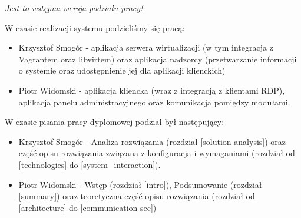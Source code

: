 \documentclass[../wstep.tex]{subfiles}
\begin{document}
\textit{Jest to wstępna wersja podziału pracy!}

W czasie realizacji systemu podzieliśmy się pracą:
\begin{itemize}
	\item Krzysztof Smogór - aplikacja serwera wirtualizacji (w tym integracja z Vagrantem oraz libvirtem) oraz aplikacja nadzorcy (przetwarzanie informacji o systemie oraz udostępnienie jej dla aplikacji klienckich)
	\item Piotr Widomski - aplikacja kliencka (wraz z integracją z klientami RDP), aplikacja panelu administracyjnego oraz komunikacja pomiędzy modułami.
\end{itemize}

W czasie pisania pracy dyplomowej podział był następujący:
\begin{itemize}
	\item Krzysztof Smogór - Analiza rozwiązania (rozdział \ref{solution-analysis}) oraz część opisu rozwiązania związana z konfiguracja i wymaganiami (rozdział od \ref{technologies} do \ref{system_interaction}).
	\item Piotr Widomski - Wstęp (rozdział \ref{intro}), Podsumowanie (rozdział \ref{summary}) oraz teoretyczna część opisu rozwiązania (rozdział od \ref{architecture} do \ref{communication-sec})
\end{itemize}
\end{document}
